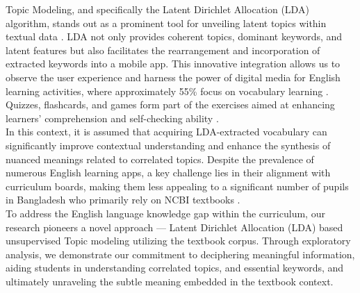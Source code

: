 \documentclass[sn-mathphys,Numbered]{sn-jnl}%
\theoremstyle{thmstyleone}%
\theoremstyle{thmstyletwo}%
\theoremstyle{thmstylethree}%
\begin{document}
Topic Modeling, and specifically the Latent Dirichlet Allocation (LDA) algorithm, stands out as a prominent tool for unveiling latent topics within textual data \cite{blei2003latent}. LDA not only provides coherent topics, dominant keywords, and latent features but also facilitates the rearrangement and incorporation of extracted keywords into a mobile app. This innovative integration allows us to observe the user experience and harness the power of digital media for English learning activities, where approximately 55\% focus on vocabulary learning \cite{klimova_evaluation_2018, hao_evaluative_2019, polakova_mobile_2019}. Quizzes, flashcards, and games form part of the exercises aimed at enhancing learners' comprehension and self-checking ability \cite{xu_scoping_2020, shortt_gamification_2023}.\\

In this context, it is assumed that acquiring LDA-extracted vocabulary can significantly improve contextual understanding and enhance the synthesis of nuanced meanings related to correlated topics. Despite the prevalence of numerous English learning apps, a key challenge lies in their alignment with curriculum boards, making them less appealing to a significant number of pupils in Bangladesh who primarily rely on NCBI textbooks \cite{metruk_use_2021, rafiq_sustaining_2021, chen_evaluating_2016}.\\

To address the English language knowledge gap within the curriculum, our research pioneers a novel approach — Latent Dirichlet Allocation (LDA) based unsupervised Topic modeling utilizing the textbook corpus. Through exploratory analysis, we demonstrate our commitment to deciphering meaningful information, aiding students in understanding correlated topics, and essential keywords, and ultimately unraveling the subtle meaning embedded in the textbook context.\\
\end{document}
